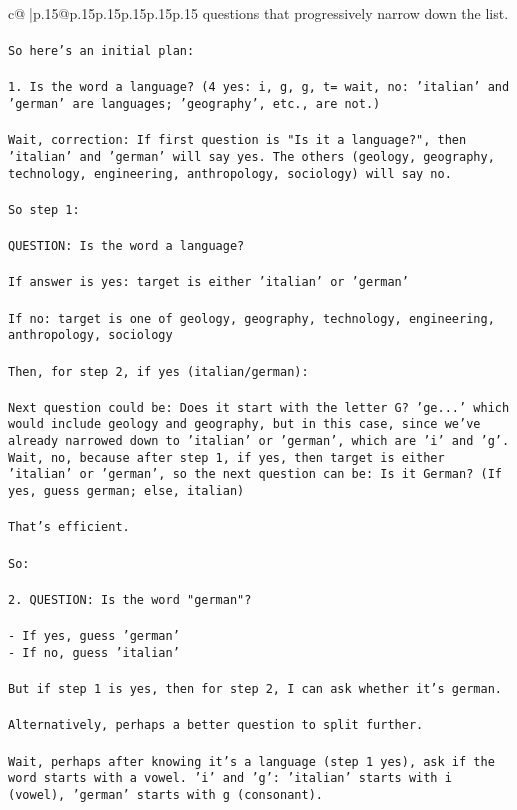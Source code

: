 \documentclass{article}
\begin{document}
{\begin{supertabular}{c@{$\;$}|p{.15\linewidth}@{}p{.15\linewidth}p{.15\linewidth}p{.15\linewidth}p{.15\linewidth}p{.15\linewidth}}
{{{questions that progressively narrow down the list.\\ \tt \\ \tt So here's an initial plan:\\ \tt \\ \tt 1. Is the word a language? (4 yes: i, g, g, t= wait, no: 'italian' and 'german' are languages; 'geography', etc., are not.)\\ \tt \\ \tt Wait, correction: If first question is "Is it a language?", then 'italian' and 'german' will say yes. The others (geology, geography, technology, engineering, anthropology, sociology) will say no.\\ \tt \\ \tt So step 1:\\ \tt \\ \tt QUESTION: Is the word a language?\\ \tt \\ \tt If answer is yes: target is either 'italian' or 'german'\\ \tt \\ \tt If no: target is one of geology, geography, technology, engineering, anthropology, sociology\\ \tt \\ \tt Then, for step 2, if yes (italian/german):\\ \tt \\ \tt Next question could be: Does it start with the letter G? 'ge...' which would include geology and geography, but in this case, since we've already narrowed down to 'italian' or 'german', which are 'i' and 'g'. Wait, no, because after step 1, if yes, then target is either 'italian' or 'german', so the next question can be: Is it German? (If yes, guess german; else, italian)\\ \tt \\ \tt That's efficient.\\ \tt \\ \tt So:\\ \tt \\ \tt 2. QUESTION: Is the word "german"?\\ \tt \\ \tt - If yes, guess 'german'\\ \tt - If no, guess 'italian'\\ \tt \\ \tt But if step 1 is yes, then for step 2, I can ask whether it's german.\\ \tt \\ \tt Alternatively, perhaps a better question to split further.\\ \tt \\ \tt Wait, perhaps after knowing it's a language (step 1 yes), ask if the word starts with a vowel. 'i' and 'g': 'italian' starts with i (vowel), 'german' starts with g (consonant). }}}
\end{supertabular}}
\end{document}
